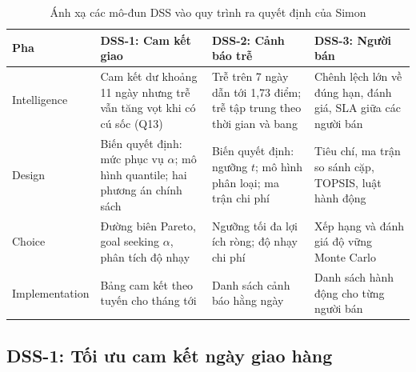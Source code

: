 \documentclass[a4paper]{article}
\newcommand{\thead}[1]{\textbf{#1}}
\begin{document}
\begin{table}[!htbp]
\centering
\caption{Ánh xạ các mô-đun DSS vào quy trình ra quyết định của Simon}
\label{tab:simon}
\small
\begin{tabularx}{\textwidth}{@{}l Y Y Y@{}}
\toprule
\thead{Pha} & \thead{DSS-1: Cam kết giao} & \thead{DSS-2: Cảnh báo trễ} & \thead{DSS-3: Người bán} \\
\midrule
Intelligence & Cam kết dư khoảng 11 ngày nhưng trễ vẫn tăng vọt khi có cú sốc (Q13) & Trễ trên 7 ngày dẫn tới 1,73 điểm; trễ tập trung theo thời gian và bang & Chênh lệch lớn về đúng hạn, đánh giá, SLA giữa các người bán \\
Design & Biến quyết định: mức phục vụ $\alpha$; mô hình quantile; hai phương án chính sách & Biến quyết định: ngưỡng $t$; mô hình phân loại; ma trận chi phí & Tiêu chí, ma trận so sánh cặp, TOPSIS, luật hành động \\
Choice & Đường biên Pareto, goal seeking $\alpha$, phân tích độ nhạy & Ngưỡng tối đa lợi ích ròng; độ nhạy chi phí & Xếp hạng và đánh giá độ vững Monte Carlo \\
Implementation & Bảng cam kết theo tuyến cho tháng tới & Danh sách cảnh báo hằng ngày & Danh sách hành động cho từng người bán \\
\bottomrule
\end{tabularx}
\end{table}

\subsection{DSS-1: Tối ưu cam kết ngày giao hàng}
\end{document}
